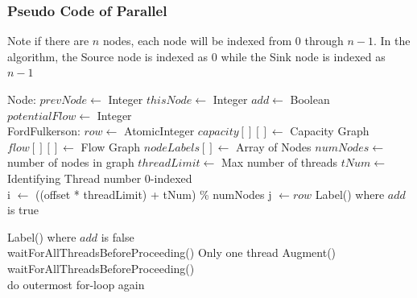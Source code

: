     \subsubsection{Pseudo Code of Parallel}
        Note if there are $n$ nodes, each node will be indexed from 0 through $n-1$. In the algorithm, the Source node is indexed as 0 while the Sink node is indexed as $n-1$
        \begin{algorithmic}
            \State Node:
                \State $prevNode \gets$ Integer
                \State $thisNode \gets$ Integer
                \State $add \gets$ Boolean
                \State $potentialFlow \gets$ Integer\\
                
            \State FordFulkerson:
                \State $row \gets$ AtomicInteger
                \State $capacity[][] \gets$ Capacity Graph
                \State $flow[][] \gets$ Flow Graph
                \State $nodeLabels[] \gets$ Array of Nodes
                \State $numNodes \gets$ number of nodes in graph
                \State $threadLimit \gets$ Max number of threads
                \State $tNum \gets$ Identifying Thread number 0-indexed
                \\
                
                    \State i $\gets$ ((offset * threadLimit) + tNum) \% numNodes
                        \State j $\gets row$
                            \State
                                    Label() where $add$ is true
                                \EndIf
                                
                                    Label() where $add$ is false
                                \EndIf
                        \EndIf\\
                        waitForAllThreadsBeforeProceeding()
                    \EndFor
                        Only one thread Augment()\\
                        waitForAllThreadsBeforeProceeding()\\
                        do outermost for-loop again
                    \EndIf\\
                \EndFor\\
                

\end{algorithmic}

